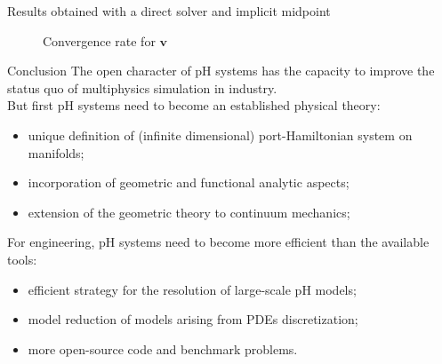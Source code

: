 \documentclass[aspectratio=169]{beamer}
\begin{document}
\begin{frame}{Results obtained with a direct solver and implicit midpoint}
{\begin{figure}
			\caption*{Convergence rate for $\bm{v}$}%
		\end{figure}
	}
	
	
	
\end{frame}

\begin{frame}{Conclusion}
	The open character of pH systems has the capacity to improve the status quo of multiphysics simulation in industry.  \\
	\vspace{1cm}
	But first pH systems need to become an established physical theory:
	\begin{itemize}
		\item unique definition of (infinite dimensional) port-Hamiltonian system on manifolds;
		\item incorporation of geometric and functional analytic aspects;
		\item extension of the geometric theory to continuum mechanics;
	\end{itemize}
	\vspace{1cm}
	For engineering, pH systems need to become more efficient than the available tools:
	\begin{itemize}
		\item efficient strategy for the resolution of large-scale pH models;
		\item model reduction of models arising from PDEs discretization;
		\item more open-source code and benchmark problems.
	\end{itemize}
\end{frame}
	
\end{document}
